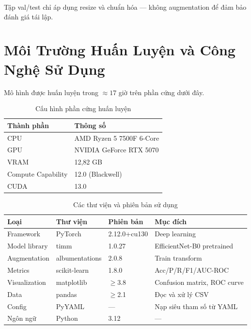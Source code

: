 Tập val/test chỉ áp dụng resize và chuẩn hóa --- không augmentation để đảm bảo đánh giá tái lập.

\section{Môi Trường Huấn Luyện và Công Nghệ Sử Dụng}

Mô hình được huấn luyện trong $\approx 17$ giờ trên phần cứng dưới đây.

\begin{table}[H]
  \centering
  \caption{Cấu hình phần cứng huấn luyện}
  \label{tab:hardware}
  \begin{tabular}{ll}
    \toprule
    \textbf{Thành phần} & \textbf{Thông số} \\
    \midrule
    CPU  & AMD Ryzen 5 7500F 6-Core \\
    GPU  & NVIDIA GeForce RTX 5070 \\
    VRAM & 12,82 GB \\
    Compute Capability & 12.0 (Blackwell) \\
    CUDA & 13.0 \\
    \bottomrule
  \end{tabular}
\end{table}

\begin{table}[H]
  \centering
  \caption{Các thư viện và phiên bản sử dụng}
  \label{tab:libraries}
  \begin{tabular}{llll}
    \toprule
    \textbf{Loại} & \textbf{Thư viện} & \textbf{Phiên bản} & \textbf{Mục đích} \\
    \midrule
    Framework     & PyTorch       & 2.12.0+cu130 & Deep learning \\
    Model library & timm          & 1.0.27       & EfficientNet-B0 pretrained \\
    Augmentation  & albumentations & 2.0.8       & Train transform \\
    Metrics       & scikit-learn  & 1.8.0        & Acc/P/R/F1/AUC-ROC \\
    Visualization & matplotlib    & $\geq$3.8    & Confusion matrix, ROC curve \\
    Data          & pandas        & $\geq$2.1    & Đọc và xử lý CSV \\
    Config        & PyYAML        & ---          & Nạp siêu tham số từ YAML \\
    Ngôn ngữ      & Python        & 3.12         & --- \\
    \bottomrule
  \end{tabular}
\end{table}

